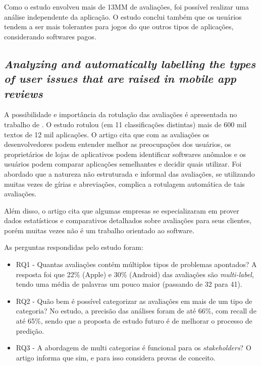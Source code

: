 Como o estudo envolveu mais de 13MM de avaliações, foi possível realizar uma análise independente da aplicação. O estudo conclui também que os usuários tendem a ser mais tolerantes para jogos do que outros tipos de aplicações, considerando softwares pagos.

\subsection{\textit{Analyzing and automatically labelling the types of user issues that are raised in mobile app reviews}}

A possibilidade e importância da rotulação das avaliações é apresentada no trabalho de  . O estudo rotulou (em 11 classificações distintas) mais de 600 mil textos de 12 mil aplicações. O artigo cita que com as avaliações os desenvolvedores podem entender melhor as preocupações dos usuários, os proprietários de lojas de aplicativos podem identificar softwares anômalos e os usuários podem comparar aplicações semelhantes e decidir quais utilizar. Foi abordado que a natureza não estruturada e informal das avaliações, se utilizando muitas vezes de gírias e abreviações, complica a rotulagem automática de tais avaliações.

Além disso, o artigo cita que algumas empresas se especializaram em prover dados estatísticos e comparativos detalhados sobre avaliações para seus clientes, porém muitas vezes não é um trabalho orientado ao software.

As perguntas respondidas pelo estudo foram:
\begin{itemize}
\item RQ1 - Quantas avaliações contém múltiplos tipos de problemas apontados?
A resposta foi que 22\% (Apple) e 30\% (Android) das avaliações são \textit{multi-label}, tendo uma média de palavras um pouco maior (passando de 32 para 41).

\item RQ2 - Quão bem é possível categorizar as avaliações em mais de um tipo de categoria?
No estudo, a precisão das análises foram de até 66\%, com recall de até 65\%, sendo que a proposta de estudo futuro é de melhorar o processo de predição.

\item RQ3 - A abordagem de multi categorias é funcional para os \textit{stakeholders}?
O artigo informa que sim, e para isso considera provas de conceito.

\end{itemize}


